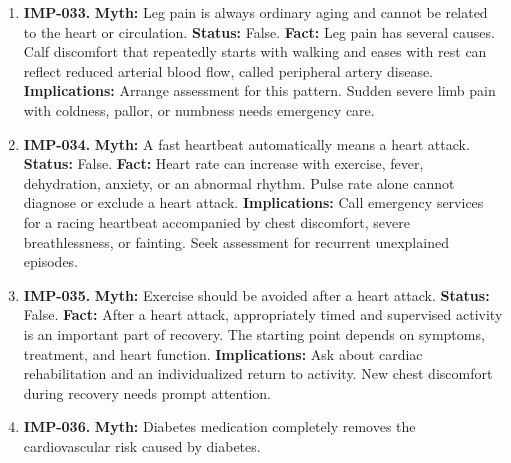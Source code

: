 \documentclass[11pt,oneside]{book}
\begin{document}
\begin{enumerate}[leftmargin=0pt,labelwidth=0pt,labelsep=0pt,itemindent=0pt]
\textbf{Status:} False.\newline
\textbf{Fact:} High cholesterol can be present well before middle age, especially in familial hypercholesterolemia. It usually causes no symptoms. \cite{ref410}\newline
\textbf{Implications:} Ask when to begin testing based on age, family history, and local guidance. Early heart disease in a close relative is particularly relevant.
\item[] \textbf{IMP-033.} \textbf{Myth:} Leg pain is always ordinary aging and cannot be related to the heart or circulation.\newline
\textbf{Status:} False.\newline
\textbf{Fact:} Leg pain has several causes. Calf discomfort that repeatedly starts with walking and eases with rest can reflect reduced arterial blood flow, called peripheral artery disease. \cite{ref46}\newline
\textbf{Implications:} Arrange assessment for this pattern. Sudden severe limb pain with coldness, pallor, or numbness needs emergency care.
\item[] \textbf{IMP-034.} \textbf{Myth:} A fast heartbeat automatically means a heart attack.\newline
\textbf{Status:} False.\newline
\textbf{Fact:} Heart rate can increase with exercise, fever, dehydration, anxiety, or an abnormal rhythm. Pulse rate alone cannot diagnose or exclude a heart attack. \cite{ref46}\newline
\textbf{Implications:} Call emergency services for a racing heartbeat accompanied by chest discomfort, severe breathlessness, or fainting. Seek assessment for recurrent unexplained episodes.
\item[] \textbf{IMP-035.} \textbf{Myth:} Exercise should be avoided after a heart attack.\newline
\textbf{Status:} False.\newline
\textbf{Fact:} After a heart attack, appropriately timed and supervised activity is an important part of recovery. The starting point depends on symptoms, treatment, and heart function. \cite{ref46}\newline
\textbf{Implications:} Ask about cardiac rehabilitation and an individualized return to activity. New chest discomfort during recovery needs prompt attention.
\item[] \textbf{IMP-036.} \textbf{Myth:} Diabetes medication completely removes the cardiovascular risk caused by diabetes.\newline

\end{enumerate}
\end{document}
